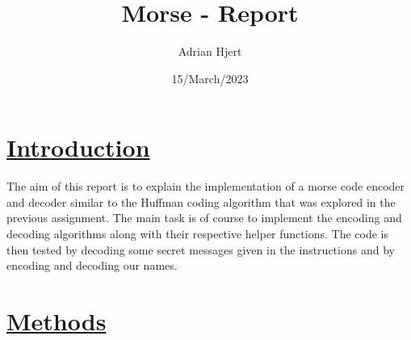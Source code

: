 \documentclass[a4paper,11pt]{article}
\begin{document}
\title{ 
	\textbf{Morse - Report}
	}
\author{Adrian Hjert}
\date{15/March/2023}

\maketitle

\section*{
	\underline{Introduction}
	}
The aim of this report is to explain the implementation of a morse code encoder and decoder similar to the Huffman coding algorithm that was explored in the previous assignment. The main task is of course to implement the encoding and decoding algorithms along with their respective helper functions. The code is then tested by decoding some secret messages given in the instructions and by encoding and decoding our names.
	
	
	
	
\section*{
	\underline{Methods}
	}
\end{document}
